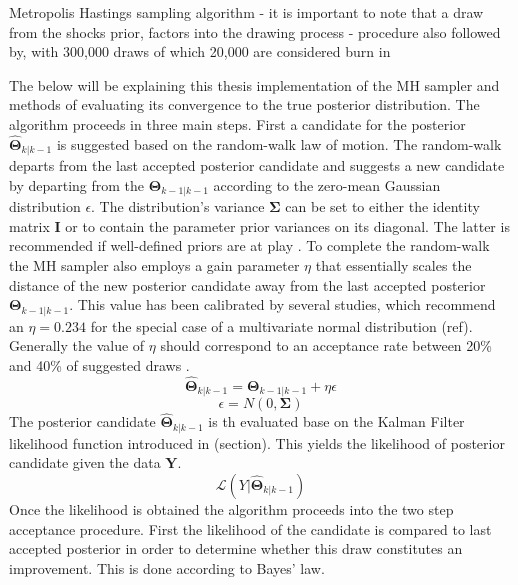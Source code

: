 \documentclass[12pt,a4paper,english]{article} %
\newcommand{\matr}[1]{\mathbf{#1}} %
\newcommand{\Lagr}{\mathcal{L}} %
\begin{document}
	Metropolis Hastings sampling algorithm
	- it is important to note that a draw from the shocks prior, factors into the drawing process
	- procedure also followed by, with 300,000 draws of which 20,000 are considered burn in \cite{chin_bayesian_2019}
		
	The below will be explaining this thesis implementation of the MH sampler and methods of evaluating its convergence to the true posterior distribution. The algorithm proceeds in three main steps.
	First a candidate for the posterior $\matr{\hat{\Theta}}_{k|k-1}$ is suggested based on the random-walk law of motion. The random-walk departs from the last accepted posterior candidate and suggests a new candidate by departing from the $\matr{\Theta}_{k-1|k-1}$ according to the zero-mean Gaussian distribution $\epsilon$. The distribution's variance $\matr{\Sigma}$ can be set to either the identity matrix $\matr{I}$ or to contain the parameter prior variances on its diagonal. The latter is recommended if well-defined priors are at play \cite{herbst_bayesian_2016}.
	 To complete the random-walk the MH sampler also employs a gain parameter $\eta$ that essentially scales the distance of the new posterior candidate away from the last accepted posterior $\matr{\Theta}_{k-1|k-1}$. This value has been calibrated by several studies, which recommend an $\eta = 0.234$ for the special case of a multivariate normal distribution (ref). Generally the value of $\eta$ should correspond to an acceptance rate between 20\% and 40\% of suggested draws \cite{herbst_bayesian_2016}.
	\[
		\matr{\hat{\Theta}}_{k|k-1} = \matr{\Theta}_{k-1|k-1} + \eta \epsilon
	\]
	\[
		\epsilon = N(0, \matr{\Sigma})
	\]
	The posterior candidate  $\matr{\hat{\Theta}}_{k|k-1}$  is th evaluated base on the Kalman Filter likelihood function introduced in (section). This yields the likelihood of posterior candidate given the data $\matr Y$.
	\[
		 \Lagr(Y| \matr{\hat{\Theta}}_{k|k-1})
	\]
	Once the likelihood is obtained the algorithm proceeds into the two step acceptance procedure. First the likelihood of the candidate is compared to last accepted posterior in order to determine whether this draw constitutes an improvement. This is done according to Bayes' law. 
\end{document}
